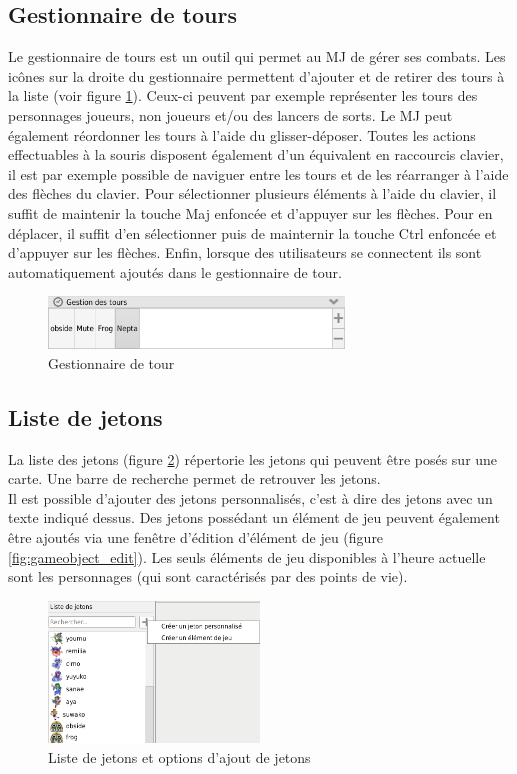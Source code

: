 \subsection{Gestionnaire de tours}
Le gestionnaire de tours est un outil qui permet au MJ de gérer ses combats. Les icônes sur la droite du gestionnaire permettent d'ajouter et de retirer des tours à la liste (voir figure \ref{fig:turnManager}). Ceux-ci peuvent par exemple représenter les tours des personnages joueurs, non joueurs et/ou des lancers de sorts. Le MJ peut également réordonner les tours à l'aide du glisser-déposer. Toutes les actions effectuables à la souris disposent également d'un équivalent en raccourcis clavier, il est par exemple possible de naviguer entre les tours et de les réarranger à l'aide des flèches du clavier. Pour sélectionner plusieurs éléments à l'aide du clavier, il suffit de maintenir la touche Maj enfoncée et d'appuyer sur les flèches. Pour en déplacer, il suffit d'en sélectionner puis de mainternir la touche Ctrl enfoncée et d'appuyer sur les flèches. Enfin, lorsque des utilisateurs se connectent ils sont automatiquement ajoutés dans le gestionnaire de tour.

\begin{figure}[h!]
	\centering
	\includegraphics[width=0.7\textwidth]{img/turn_manager.png}
	\caption{Gestionnaire de tour}
	\label{fig:turnManager}
\end{figure}
\newpage

\subsection{Liste de jetons}
La liste des jetons (figure \ref{fig:tokenmenu}) répertorie les jetons qui peuvent être posés sur une carte. Une barre de recherche permet de retrouver les jetons.\\
Il est possible d'ajouter des jetons personnalisés, c'est à dire des jetons avec un texte indiqué dessus. Des jetons possédant un élément de jeu peuvent également être ajoutés via une fenêtre d'édition d'élément de jeu (figure \ref{fig:gameobject_edit}). Les seuls éléments de jeu disponibles à l'heure actuelle sont les personnages (qui sont caractérisés par des points de vie).

\begin{figure}[h!]
	\centering
	\includegraphics[width=0.5\textwidth]{img/tokenmenu.png}
	\caption{Liste de jetons et options d'ajout de jetons}
	\label{fig:tokenmenu}
\end{figure}

